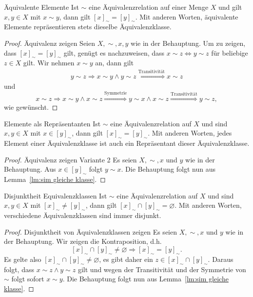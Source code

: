     
    \begin{lemma}{Äquivalente Elemente}
    Ist $\sim $ eine Äquivalenzrelation auf einer Menge $X$ und gilt $x,y\in X$ mit $x\sim y$, dann gilt $[x]_\sim=[y]_\sim$. Mit anderen Worten, äquivalente Elemente repräsentieren stets dieselbe Äquivalenzklasse.
    \end{lemma}
    
    \begin{proof}{Äquivalenz zeigen}
    Seien $X,\sim,x,y$ wie in der Behauptung. Um zu zeigen, dass $[x]_\sim=[y]_\sim$ gilt, genügt es nachzuweisen, dass $x\sim z\Leftrightarrow y\sim z$ für beliebige $z\in X$ gilt. Wir nehmen $x\sim y$ an, dann gilt
    \begin{align*}
    y\sim z\Rightarrow x\sim y\land y\sim z \stackrel{\text{Transitivität}}{\Longrightarrow} x\sim z
    \end{align*}
    und
    \[
    x\sim z\Rightarrow x\sim y\land x\sim z\stackrel{\text{Symmetrie}}{\Longrightarrow} y\sim x\land x\sim z\stackrel{\text{Transitivität}}{\Longrightarrow} y\sim z,
    \]
    wie gewünscht.
    \end{proof}
    
    \begin{corollary}{Elemente als Repräsentanten}
    Ist $\sim $ eine Äquivalenzrelation auf $X$ und sind $x,y\in X$ mit $x\in[y]_\sim$, dann gilt $[x]_\sim=[y]_\sim$. Mit anderen Worten, jedes Element einer Äquivalenzklasse ist auch ein Repräsentant dieser Äquivalenzklasse.
    \end{corollary}
    
    \begin{proof}{Äquivalenz zeigen Variante 2}
    Es seien $X,\sim,x$ und $y$ wie in der Behauptung. Aus $x\in[y]_\sim$ folgt $y\sim x$. Die Behauptung folgt nun aus Lemma~\ref{lm:sim gleiche klasse}.
    \end{proof}

    \begin{lemma}{Disjunktheit Equivalenzklassen}
    Ist $\sim $ eine Äquivalenzrelation auf $X$ und sind $x,y\in X$ mit $[x]_\sim\neq[y]_\sim$, dann gilt $[x]_\sim\cap[y]_\sim=\varnothing$.
    Mit anderen Worten, verschiedene Äquivalenzklassen sind immer disjunkt.
    \end{lemma}
    
    \begin{proof}{Disjunktheit von Äquivalenzklassen zeigen}
    Es seien $X,\sim,x$ und $y$ wie in der Behauptung. Wir zeigen die Kontraposition, d.h.
    \[
    [x]_\sim\cap[y]_\sim\neq\varnothing\Rightarrow [x]_\sim=[y]_\sim.
    \]
    Es gelte also $[x]_\sim\cap[y]_\sim\neq\varnothing$, es gibt daher ein $z\in [x]_\sim\cap[y]_\sim$. Daraus folgt, dass $x\sim z\land y\sim z$ gilt und wegen der Transitivität und der Symmetrie von $\sim$ folgt sofort $x\sim y$. Die Behauptung folgt nun aus Lemma~\ref{lm:sim gleiche klasse}.
    \end{proof}


